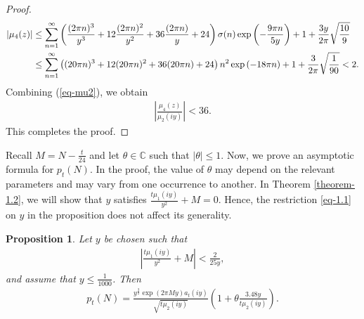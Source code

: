 \documentclass[10pt,a4paper]{amsart}
\newtheorem{proposition}[theorem]{Proposition}
\numberwithin{equation}{section}
\begin{document}
\begin{proof}
		\begin{align*}%
			\notag
			|\mu_{4}(z)|
			&\le\sum_{n=1}^{\infty}\left(\frac{(2\pi n)^{3}}{y^{3}}+12\frac{(2\pi n)^{2}}{y^{2}}+36\frac{(2\pi n)}{y}+24\right)\sigma(n)\exp\left(-\frac{9\pi n}{5y}\right)+1+\frac{3y}{2\pi}\sqrt{\frac{10}{9}}\\
			&\le\sum_{n=1}^{\infty}\left((20\pi n)^{3}+12(20\pi n)^{2}+36(20\pi n)+24\right)n^{2}\exp\left(-18\pi n\right)+1+\frac{3}{2\pi}\sqrt{\frac{1}{90}}<2.
		\end{align*}
		Combining (\ref{eq-mu2}), we obtain
		\begin{align*}
			\left|\frac{\mu_{4}(z)}{\mu_2(iy)}\right|<36.     
		\end{align*}
		This completes the proof.
	\end{proof}
	Recall $M=N-\frac{t}{24}$ and let $\theta \in \mathbb{C}$ such that $|\theta|\le 1$. Now, we prove an asymptotic formula for $p_t(N)$. In the proof, the value of $\theta$ may depend on the relevant parameters and may vary from one occurrence to another. In Theorem \ref{theorem-1.2}, we will show that $y$ satisfies $\frac{t\mu_{1}(iy)}{y^{2}}+M=0$. Hence, the restriction \eqref{eq-1.1} on $y$ in the proposition does not affect its generality.
	\begin{proposition}\label{theorem-main} Let $y$ be chosen such that 
		\begin{align}\label{eq-assum}
			\left|\frac{t\mu_{1}(iy)}{y^{2}}+M\right|<\frac{2}{25y},
		\end{align} and assume that $y\le \frac{1}{1000}$. Then
		\begin{align*}
			p_t(N)=\frac{y^{\frac{3}{2}}\exp(2\pi My)a_{t}(iy)}{\sqrt{t\mu_{2}(iy)}}\left(1+\theta\frac{3.48y}{t\mu_2(iy)}\right).    
		\end{align*}
	\end{proposition}
\end{document}
